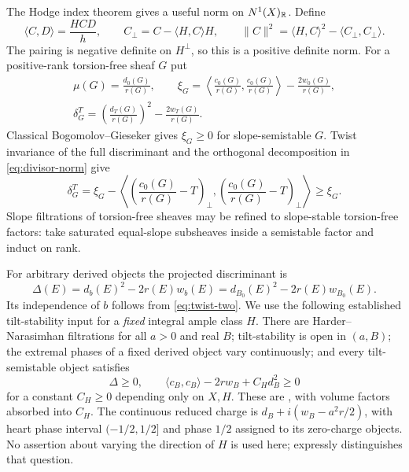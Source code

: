 The Hodge index theorem gives a useful norm on $N^1(X)_{\mathbb R}$.
Define
\begin{equation}\label{eq:divisor-norm}
 \langle C,D\rangle=\frac{HCD}{h},\qquad
 C_\perp=C-\langle H,C\rangle H,\qquad
 \|C\|^2=\langle H,C\rangle^2-\langle C_\perp,C_\perp\rangle.
\end{equation}
The pairing is negative definite on $H^\perp$, so this is a positive
definite norm.  For a positive-rank torsion-free sheaf $G$ put
\begin{equation}\label{eq:sheaf-discriminants}
\begin{gathered}
 \mu(G)=\frac{d_0(G)}{r(G)},\qquad
 \xi_G=\left\langle\frac{c_0(G)}{r(G)},\frac{c_0(G)}{r(G)}\right\rangle
             -\frac{2w_0(G)}{r(G)},\\
 \delta_G^T=\left(\frac{d_T(G)}{r(G)}\right)^2
             -\frac{2w_T(G)}{r(G)}.
\end{gathered}
\end{equation}
Classical Bogomolov--Gieseker gives $\xi_G\ge0$ for slope-semistable
$G$.  Twist invariance of the full discriminant and the orthogonal
decomposition in \eqref{eq:divisor-norm} give
\begin{equation}\label{eq:xi-delta}
 \delta_G^T=\xi_G-\left\langle
 \left(\frac{c_0(G)}{r(G)}-T\right)_\perp,
 \left(\frac{c_0(G)}{r(G)}-T\right)_\perp\right\rangle\ge\xi_G.
\end{equation}
Slope filtrations of torsion-free sheaves may be refined to slope-stable
torsion-free factors: take saturated equal-slope subsheaves inside a
semistable factor and induct on rank.

For arbitrary derived objects the projected discriminant is
\begin{equation}\label{eq:projected-discriminant}
 \Delta(E)=d_b(E)^2-2r(E)w_b(E)
           =d_{B_0}(E)^2-2r(E)w_{B_0}(E).
\end{equation}
Its independence of $b$ follows from \eqref{eq:twist-two}.
We use the following established tilt-stability input for a \emph{fixed}
integral ample class $H$.  There are Harder--Narasimhan filtrations for
all $a>0$ and real $B$; tilt-stability is open in $(a,B)$; the extremal
phases of a fixed derived object vary continuously; and every
tilt-semistable object satisfies
\begin{equation}\label{eq:tilt-discriminants}
 \Delta\ge0,\qquad
 \langle c_B,c_B\rangle-2rw_B+C_Hd_B^2\ge0
\end{equation}
for a constant $C_H\ge0$ depending only on $X,H$.
These are \cite[Theorem~3.5 and Propositions~B.2 and~B.5]{BMS2016},
with volume factors absorbed into $C_H$.  The continuous reduced charge
is $d_B+i(w_B-a^2r/2)$, with heart phase interval
$(-1/2,1/2]$ and phase $1/2$ assigned to its zero-charge objects.
No assertion about varying the direction of $H$ is used here;
\cite[Remark~B.6(b)]{BMS2016} expressly distinguishes that question.

